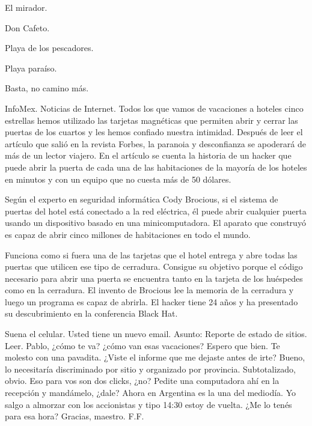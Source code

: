 \documentclass[12pt,twoside,openright,a5paper]{book}
\begin{document}
El mirador.

Don Cafeto.

Playa de los pescadores.

Playa paraíso.

Basta, no camino más.

\vspace{0.5cm}

\hrulefill\hspace{0.2cm} \decofourleft\decofourright \hspace{0.2cm} \hrulefill
\vspace{0.5cm}

InfoMex. Noticias de Internet. Todos los que vamos de vacaciones a hoteles
cinco estrellas hemos utilizado las tarjetas magnéticas que permiten
abrir y cerrar las puertas de los cuartos y les hemos confiado nuestra
intimidad. Después de leer el artículo que salió en la revista Forbes,
la paranoia y desconfianza se apoderará de más de un lector viajero. En
el artículo se cuenta la historia de un hacker que puede abrir la puerta
de cada una de las habitaciones de la mayoría de los hoteles en minutos
y con un equipo que no cuesta más de 50 dólares.

Según el experto en seguridad informática Cody Brocious, si el sistema
de puertas del hotel está conectado a la red eléctrica, él puede abrir
cualquier puerta usando un dispositivo basado en una minicomputadora.
El aparato que construyó es capaz de abrir cinco millones de
habitaciones en todo el mundo.

Funciona como si fuera una de las tarjetas que el hotel entrega
y abre todas las puertas que utilicen ese tipo de cerradura. Consigue su
objetivo porque el código necesario para abrir una puerta se encuentra
tanto en la tarjeta de los huéspedes como en la cerradura. El invento de
Brocious lee la memoria de la cerradura y luego un programa es capaz de
abrirla. El hacker tiene 24 años y ha presentado su descubrimiento en la
conferencia Black Hat.

\vspace{0.5cm}

\hrulefill\hspace{0.2cm} \decofourleft\decofourright \hspace{0.2cm} \hrulefill
\vspace{0.5cm}

Suena el celular. Usted tiene un nuevo email. Asunto: Reporte de estado de sitios. Leer. Pablo, ¿cómo te va? ¿cómo van esas vacaciones? Espero que bien.
Te molesto con una pavadita. ¿Viste el informe que me dejaste antes de irte?
Bueno, lo necesitaría discriminado por sitio y organizado por provincia.
Subtotalizado, obvio. Eso para vos son dos clicks, ¿no?
Pedite una computadora ahí en la recepción y mandámelo, ¿dale? Ahora en
Argentina es la una del mediodía. Yo salgo a almorzar con los accionistas
y tipo 14:30 estoy de vuelta. ¿Me lo tenés para esa hora?
Gracias, maestro.
F.F.
\end{document}
